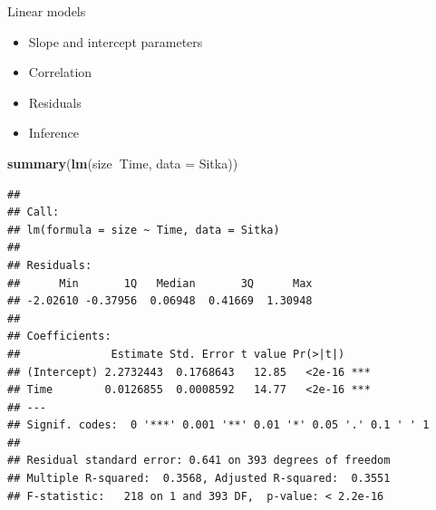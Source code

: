 \documentclass[
  ignorenonframetext,
]{beamer}
\newenvironment{Shaded}{\begin{snugshade}}{\end{snugshade}}
\newcommand{\DataTypeTok}[1]{\textcolor[rgb]{0.13,0.29,0.53}{#1}}
\newcommand{\KeywordTok}[1]{\textcolor[rgb]{0.13,0.29,0.53}{\textbf{#1}}}
\newcommand{\NormalTok}[1]{#1}
\newcommand{\OperatorTok}[1]{\textcolor[rgb]{0.81,0.36,0.00}{\textbf{#1}}}
\providecommand{\tightlist}{%
  \setlength{\itemsep}{0pt}\setlength{\parskip}{0pt}}
\begin{document}
\begin{frame}[fragile]{Linear models}
\protect\hypertarget{linear-models}{}

\begin{itemize}
\tightlist
\item
  Slope and intercept parameters
\item
  Correlation
\item
  Residuals
\item
  Inference
\end{itemize}

\scriptsize

\begin{Shaded}
\begin{Highlighting}[]
\KeywordTok{summary}\NormalTok{(}\KeywordTok{lm}\NormalTok{(size}\OperatorTok{~}\NormalTok{Time, }\DataTypeTok{data =}\NormalTok{ Sitka))}
\end{Highlighting}
\end{Shaded}

\begin{verbatim}
## 
## Call:
## lm(formula = size ~ Time, data = Sitka)
## 
## Residuals:
##      Min       1Q   Median       3Q      Max 
## -2.02610 -0.37956  0.06948  0.41669  1.30948 
## 
## Coefficients:
##              Estimate Std. Error t value Pr(>|t|)    
## (Intercept) 2.2732443  0.1768643   12.85   <2e-16 ***
## Time        0.0126855  0.0008592   14.77   <2e-16 ***
## ---
## Signif. codes:  0 '***' 0.001 '**' 0.01 '*' 0.05 '.' 0.1 ' ' 1
## 
## Residual standard error: 0.641 on 393 degrees of freedom
## Multiple R-squared:  0.3568, Adjusted R-squared:  0.3551 
## F-statistic:   218 on 1 and 393 DF,  p-value: < 2.2e-16
\end{verbatim}

\normalsize

\end{frame}
\end{document}
